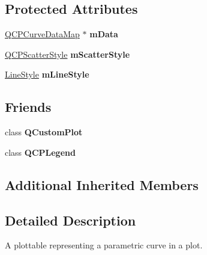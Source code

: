 \subsection*{Protected Attributes}
\begin{DoxyCompactItemize}
\item 
\hypertarget{classQCPCurve_a88d533e455bca96004b049e99168731b}{}\hyperlink{qcustomplot_8h_a444d37ec9cb2951b3a7fe443c34d1658}{Q\+C\+P\+Curve\+Data\+Map} $\ast$ {\bfseries m\+Data}\label{classQCPCurve_a88d533e455bca96004b049e99168731b}

\item 
\hypertarget{classQCPCurve_a08f803b4a30b01bbd7a1eab15d0f864f}{}\hyperlink{classQCPScatterStyle}{Q\+C\+P\+Scatter\+Style} {\bfseries m\+Scatter\+Style}\label{classQCPCurve_a08f803b4a30b01bbd7a1eab15d0f864f}

\item 
\hypertarget{classQCPCurve_ae1f35ae2b15aee8e15bcdfec5be95156}{}\hyperlink{classQCPCurve_a2710e9f79302152cff794c6e16cc01f1}{Line\+Style} {\bfseries m\+Line\+Style}\label{classQCPCurve_ae1f35ae2b15aee8e15bcdfec5be95156}

\end{DoxyCompactItemize}
\subsection*{Friends}
\begin{DoxyCompactItemize}
\item 
\hypertarget{classQCPCurve_a1cdf9df76adcfae45261690aa0ca2198}{}class {\bfseries Q\+Custom\+Plot}\label{classQCPCurve_a1cdf9df76adcfae45261690aa0ca2198}

\item 
\hypertarget{classQCPCurve_a8429035e7adfbd7f05805a6530ad5e3b}{}class {\bfseries Q\+C\+P\+Legend}\label{classQCPCurve_a8429035e7adfbd7f05805a6530ad5e3b}

\end{DoxyCompactItemize}
\subsection*{Additional Inherited Members}


\subsection{Detailed Description}
A plottable representing a parametric curve in a plot. 



